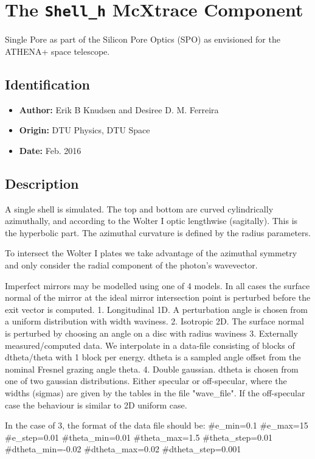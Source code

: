 \section{The \texttt{Shell\_h} McXtrace Component}
Single Pore as part of the Silicon Pore Optics (SPO) as envisioned for the ATHENA+ space telescope.

\subsection*{Identification}
\begin{itemize}
  \item \textbf{Author:} Erik B Knudsen and Desiree D. M. Ferreira
  \item \textbf{Origin:} DTU Physics, DTU Space
  \item \textbf{Date:} Feb. 2016
\end{itemize}

\subsection*{Description}
A single shell is simulated. The top and bottom are curved cylindrically azimuthally, and according to the Wolter I optic lengthwise (sagitally). This is the hyperbolic part. The azimuthal curvature is defined by the radius parameters.

To intersect the Wolter I plates we take advantage of the azimuthal symmetry and only consider the radial component of the photon's wavevector.

Imperfect mirrors may be modelled using one of 4 models. In all cases the surface normal of the mirror at the ideal mirror intersection point is perturbed before the exit vector is computed. 1. Longitudinal 1D. A perturbation angle is chosen from a uniform distribution with width waviness. 2. Isotropic 2D. The surface normal is perturbed by choosing an angle on a disc with radius waviness 3. Externally measured/computed data. We interpolate in a data-file consisting of blocks of dtheta/theta with 1 block per energy. dtheta is a sampled angle offset from the nominal Fresnel grazing angle theta. 4. Double gaussian. dtheta is chosen from one of two gaussian distributions. Either specular or off-specular, where the widths (sigmas) are given by the tables in the file "wave\_file". If the off-specular case the behaviour is similar to 2D uniform case.

In the case of 3, the format of the data file should be: \#e\_min=0.1 \#e\_max=15 \#e\_step=0.01 \#theta\_min=0.01 \#theta\_max=1.5 \#theta\_step=0.01 \#dtheta\_min=-0.02 \#dtheta\_max=0.02 \#dtheta\_step=0.001

